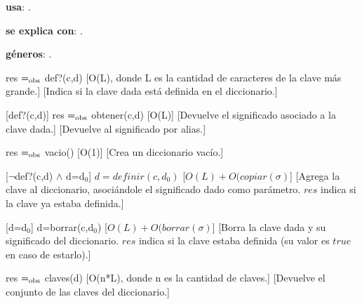 \begin{Interfaz}
  
  \textbf{usa}: \tadNombre{}.
  
  \textbf{se explica con}: .
  
  \textbf{g\'eneros}: .


  {res $=_{\mathrm{obs}}$ def?(c,d)}
  [O(L), donde L es la cantidad de caracteres de la clave m\'as grande.]
  [Indica si la clave dada est\'a definida en el diccionario.]

  [def?(c,d)]
  {res $=_{\mathrm{obs}}$ obtener(c,d)}
  [O(L)]
  [Devuelve el significado asociado a la clave dada.]
  [Devuelve al significado por alias.]
  
  {res $=_{\mathrm{obs}}$ vacio()}
  [O(1)]
  [Crea un diccionario vac\'io.]
  
  [$\neg$def?(c,d) $\wedge$ d=d$_0$]
  {$d = definir(c,d_0)$}
  [$O(L)+O(copiar(\sigma)$]
  [Agrega la clave al diccionario, asoci\'andole el significado dado como par\'ametro. $res$ indica si la clave ya estaba definida.]
  
  [d=d$_0$]
  {d=borrar(c,d$_0$)}
  [$O(L)+O(borrar(\sigma)$]
  [Borra la clave dada y su significado del diccionario. $res$ indica si la clave estaba definida (su valor es $true$ en caso de estarlo).]
  
  {res $=_{\mathrm{obs}}$ claves(d)}
  [O(n*L), donde n es la cantidad de claves.]
  [Devuelve el conjunto de las claves del diccionario.] 


\end{Interfaz}

